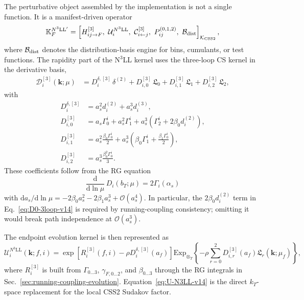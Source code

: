 \documentclass[11pt]{article}
\newcommand{\bk}{\bm{k}}
\newcommand{\dd}{\mathrm{d}}
\newcommand{\deltaT}{\delta^{(2)}}
\newcommand{\order}[1]{\mathcal{O}\!\left(#1\right)}
\newcommand{\ExpT}{\mathrm{Exp}_{\otimes_T}}
\newcommand{\KCSS}{\mathcal K_{\rm CSS2}}
\begin{document}
The perturbative object assembled by the implementation is not a single function.  It is a
manifest-driven operator
\begin{equation}
  \mathbb K_{F}^{N^3\mathrm{LL}'}
  =
  \left[
  H_{ij\to F}^{[3]},\
  \mathcal U_i^{N^3\mathrm{LL}},\
  \mathcal C_{i\leftarrow j}^{[3]},\
  P_{ij}^{(0,1,2)},\
  \mathcal B_{\rm dist}
  \right]_{\KCSS},
  \label{eq:kernel-object-v14}
\end{equation}
where \(\mathcal B_{\rm dist}\) denotes the distribution-basis engine for bins, cumulants,
or test functions.  The rapidity part of the N$^3$LL kernel uses the three-loop CS kernel
in the derivative basis,
\begin{align}
  \mathcal D_i^{[3]}(\bk;\mu)
  & = D_i^{\delta,[3]}\,\deltaT
  + D_{i,0}^{[3]}\,\mathfrak L_0
  + D_{i,1}^{[3]}\,\mathfrak L_1
  + D_{i,2}^{[3]}\,\mathfrak L_2,
  \label{eq:D3-decomp-v14}
\end{align}
with
\begin{align}
  D_i^{\delta,[3]}
  &= a_s^2 d_i^{(2)}+a_s^3 d_i^{(3)},
  \label{eq:Ddelta3-v14}
  \\
  D_{i,0}^{[3]}
  &= a_s\Gamma_0^i
   + a_s^2\Gamma_1^i
   + a_s^3\left(\Gamma_2^i+2\beta_0d_i^{(2)}\right),
  \label{eq:D0-3loop-v14}
  \\
  D_{i,1}^{[3]}
  &= a_s^2\frac{\beta_0\Gamma_0^i}{2}
   + a_s^3\left(\beta_0\Gamma_1^i+\frac{\beta_1\Gamma_0^i}{2}\right),
  \label{eq:D1-3loop-v14}
  \\
  D_{i,2}^{[3]}
  &= a_s^3\frac{\beta_0^2\Gamma_0^i}{3} .
  \label{eq:D2-3loop-v14}
\end{align}
These coefficients follow from the RG equation
\begin{equation}
  \frac{\dd}{\dd\ln\mu}\,D_i(b_T;\mu)=2\Gamma_i(\alpha_s)
  \label{eq:D-rg-3loop-v14}
\end{equation}
with \(\dd a_s/\dd\ln\mu=-2\beta_0a_s^2-2\beta_1a_s^3+\order{a_s^4}\).  In
particular, the \(2\beta_0d_i^{(2)}\) term in Eq.~\eqref{eq:D0-3loop-v14} is required by
running-coupling consistency; omitting it would break path independence at
\(\order{a_s^3}\).

The endpoint evolution kernel is then represented as
\begin{equation}
  \mathcal U_i^{N^3\mathrm{LL}}(\bk;f,i)
  =
  \exp\!\left[R_i^{[3]}(f,i)-\rho D_i^{\delta,[3]}(a_f)\right]
  \ExpT\!\left\{
  -\rho\sum_{r=0}^{2}D_{i,r}^{[3]}(a_f)\mathfrak L_r(\bk;\mu_f)
  \right\},
  \label{eq:U-N3LL-v14}
\end{equation}
where \(R_i^{[3]}\) is built from \(\Gamma_{0\ldots3}\),
\(\gamma_{F,0\ldots2}\), and \(\beta_{0\ldots3}\) through the RG integrals in
Sec.~\ref{sec:running-coupling-evolution}.  Equation~\eqref{eq:U-N3LL-v14} is the direct
$k_T$-space replacement for the local CSS2 Sudakov factor.
\end{document}
